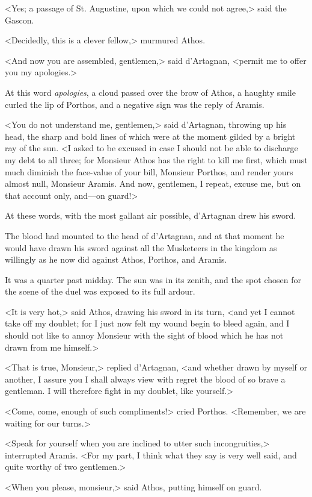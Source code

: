 <Yes; a passage of St. Augustine, upon which we could not agree,> said the Gascon. 

<Decidedly, this is a clever fellow,> murmured Athos. 

<And now you are assembled, gentlemen,> said d'Artagnan, <permit me to offer you my apologies.> 

At this word \textit{apologies}, a cloud passed over the brow of Athos, a haughty smile curled the lip of Porthos, and a negative sign was the reply of Aramis. 

<You do not understand me, gentlemen,> said d'Artagnan, throwing up his head, the sharp and bold lines of which were at the moment gilded by a bright ray of the sun. <I asked to be excused in case I should not be able to discharge my debt to all three; for Monsieur Athos has the right to kill me first, which must much diminish the face-value of your bill, Monsieur Porthos, and render yours almost null, Monsieur Aramis. And now, gentlemen, I repeat, excuse me, but on that account only, and---on guard!> 

At these words, with the most gallant air possible, d'Artagnan drew his sword. 

The blood had mounted to the head of d'Artagnan, and at that moment he would have drawn his sword against all the Musketeers in the kingdom as willingly as he now did against Athos, Porthos, and Aramis. 

It was a quarter past midday. The sun was in its zenith, and the spot chosen for the scene of the duel was exposed to its full ardour. 

<It is very hot,> said Athos, drawing his sword in its turn, <and yet I cannot take off my doublet; for I just now felt my wound begin to bleed again, and I should not like to annoy Monsieur with the sight of blood which he has not drawn from me himself.> 

<That is true, Monsieur,> replied d'Artagnan, <and whether drawn by myself or another, I assure you I shall always view with regret the blood of so brave a gentleman. I will therefore fight in my doublet, like yourself.> 

<Come, come, enough of such compliments!> cried Porthos. <Remember, we are waiting for our turns.> 

<Speak for yourself when you are inclined to utter such incongruities,> interrupted Aramis. <For my part, I think what they say is very well said, and quite worthy of two gentlemen.> 

<When you please, monsieur,> said Athos, putting himself on guard. 

